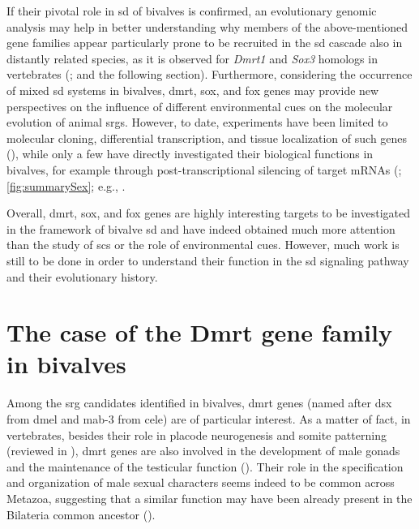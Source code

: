 If their pivotal role in \gls{sd} of bivalves is confirmed, an evolutionary genomic analysis may help in better understanding why members of the above-mentioned gene families appear particularly prone to be recruited in the \gls{sd} cascade also in distantly related species, as it is observed for \textit{Dmrt1} and \textit{Sox3} homologs in vertebrates (; and the following section). Furthermore, considering the occurrence of mixed \gls{sd} systems in bivalves, \gls{dmrt}, \gls{sox}, and \gls{fox} genes may provide new perspectives on the influence of different environmental cues on the molecular evolution of animal \glspl{srg}. However, to date, experiments have been limited to molecular cloning, differential transcription, and tissue localization of such genes (), while only a few have directly investigated their biological functions in bivalves, for example through post-transcriptional silencing of target mRNAs (; \cref{fig:summarySex}; e.g., .

Overall, \gls{dmrt}, \gls{sox}, and \gls{fox} genes are highly interesting targets to be investigated in the framework of bivalve \gls{sd} and have indeed obtained much more attention than the study of \glspl{sc} or the role of environmental cues. However, much work is still to be done in order to understand their function in the \gls{sd} signaling pathway and their evolutionary history.

\section{The case of the Dmrt gene family in bivalves}

Among the \gls{srg} candidates identified in bivalves, \gls{dmrt} genes (named after \gls{dsx} from \gls{dmel} and \gls{mab-3} from \gls{cele}) are of particular interest. As a matter of fact, in vertebrates, besides their role in placode neurogenesis and somite patterning (reviewed in ), \gls{dmrt} genes are also involved in the development of male gonads and the maintenance of the testicular function (). Their role in the specification and organization of male sexual characters seems indeed to be common across Metazoa, suggesting that a similar function may have been already present in the Bilateria common ancestor ().

